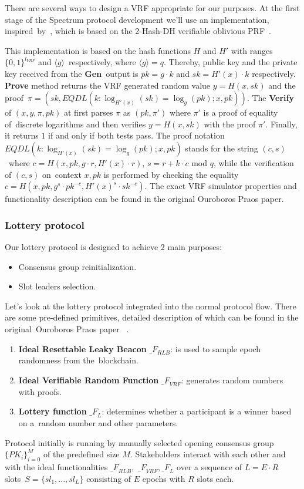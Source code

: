 There are several ways to design a VRF appropriate for our purposes.
At the first stage of the Spectrum protocol development we'll use an implementation, inspired\
by~\cite{cryptoeprint:2017/573}, which is based on the 2-Hash-DH verifiable oblivious PRF~\cite{asiacrypt:2014/233}.

This implementation is based on the hash functions $H$ and $H'$  with ranges $\{0,1\}^{l_{VRF}}$ and ${\langle g \rangle}$\
respectively, where ${\langle g \rangle = q}$.
Thereby, public key and the private key received from the \textbf{Gen}\
output is ${pk = g \cdot k}$ and ${sk = H'(x) \cdot k}$ respectively.
\textbf{Prove} method returns the VRF generated random value ${y = H(x, sk)}$ and the proof\
${\pi = (sk, EQDL(k : \log_{H'(x)}(sk) = \log_{g}(pk); x, pk))}$.
The \textbf{Verify} of ${(x, y, \pi, pk)}$ at first parses $\pi$ as ${(pk, \pi')}$ where $\pi'$ is a proof of equality of\
discrete logarithms and then verifies ${y = H(x, sk)}$ with the proof $\pi'$.
Finally, it returns $1$ if and only if both tests pass.
The proof notation ${EQDL(k : \log_{H'(x)}(sk) = \log_{g}(pk); x, pk)}$ stands for the string ${(c, s)}$\
where $c = H(x, pk, g \cdot r, H'(x) \cdot r)$, ${s = r + k \cdot c}$ mod $q$, while the verification of ${(c, s)}$ on\
context ${x, pk}$ is performed by checking the equality ${c = H(x, pk, g^s \cdot pk^{-c}, H'(x)^s \cdot sk^{-c})}$.
The exact VRF simulator properties and functionality description can be found in the original Ouroboros Praos paper.

\subsubsection{Lottery protocol}
Our lottery protocol is designed to achieve 2 main purposes:
\begin{itemize}
    \item Consensus group reinitialization.
    \item Slot leaders selection.
\end{itemize}

Let's look at the lottery protocol integrated into the normal protocol flow.
There are some pre-defined primitives, detailed description of which can be found in the original\
Ouroboros Praos paper ~\cite{cryptoeprint:2017/573}.
\begin{enumerate}
    \item \textbf{Ideal Resettable Leaky Beacon} ${\mathcal_{F}}_{RLB}$: is used to sample epoch randomness from the\
    blockchain.
    \item \textbf{Ideal Verifiable Random Function} ${\mathcal_{F}}_{VRF}$: generates random numbers with proofs.
    \item \textbf{Lottery function} ${\mathcal_{F}}_{L}$: determines whether a participant is a winner based on a\
    random number and other parameters.
\end{enumerate}
Protocol initially is running by manually selected opening consensus group $\{PK_i\}_{i=0}^M$ of the predefined size $M$.
Stakeholders interact with each other and with the ideal functionalities ${\mathcal_{F}}_{RLB}$,\
${\mathcal_{F}}_{VRF}, {\mathcal_{F}}_{L}$ over a sequence of $L = E \cdot R$ slots\
${S=\{sl_1,...,sl_L\}}$ consisting of $E$ epochs with $R$ slots each.

